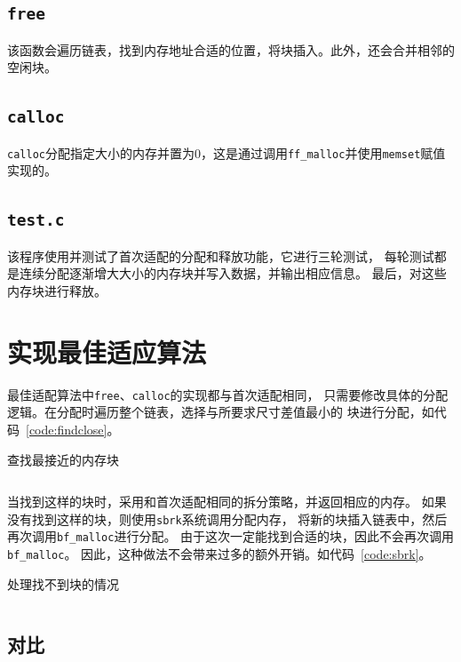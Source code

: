 \documentclass[a4paper,twoside]{article}
\begin{document}
\begin{spacing}{1.2}
\subsection{\texttt{free}}

该函数会遍历链表，找到内存地址合适的位置，将块插入。此外，还会合并相邻的空闲块。

\subsection{\texttt{calloc}}

\texttt{calloc}分配指定大小的内存并置为0，这是通过调用\texttt{ff\_malloc}并使用\texttt{memset}赋值实现的。

\subsection{\texttt{test.c}}

该程序使用并测试了首次适配的分配和释放功能，它进行三轮测试，
每轮测试都是连续分配逐渐增大大小的内存块并写入数据，并输出相应信息。
最后，对这些内存块进行释放。

\section{实现最佳适应算法}

最佳适配算法中\texttt{free}、\texttt{calloc}的实现都与首次适配相同，
只需要修改具体的分配逻辑。在分配时遍历整个链表，选择与所要求尺寸差值最小的
块进行分配，如代码~\ref{code:findclose}。
\begin{listing}[htb]
	\caption{查找最接近的内存块}
	\label{code:findclose}
	\inputminted[firstline=84,lastline=106]{c}{../code/3/bf_malloc.c}
\end{listing}
当找到这样的块时，采用和首次适配相同的拆分策略，并返回相应的内存。
如果没有找到这样的块，则使用\texttt{sbrk}系统调用分配内存，
将新的块插入链表中，然后再次调用\texttt{bf\_malloc}进行分配。
由于这次一定能找到合适的块，因此不会再次调用\texttt{bf\_malloc}。
因此，这种做法不会带来过多的额外开销。如代码~\ref{code:sbrk}。
\begin{listing}[htb]
	\caption{处理找不到块的情况}
	\label{code:sbrk}
	\inputminted[firstline=136,lastline=159]{c}{../code/3/bf_malloc.c}
\end{listing}

\subsection{对比}


\end{spacing}
\end{document}

